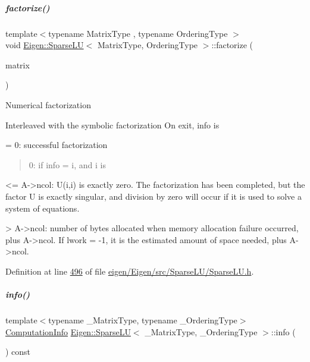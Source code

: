 \mbox{\label{group___sparse_l_u___module_a39858b0e72f2659d596364e252b34cbc}} 
\subparagraph{\texorpdfstring{factorize()}{factorize()}}
{\footnotesize\ttfamily template$<$typename Matrix\+Type , typename Ordering\+Type $>$ \\
void \hyperlink{group___sparse_l_u___module_class_eigen_1_1_sparse_l_u}{Eigen\+::\+Sparse\+LU}$<$ Matrix\+Type, Ordering\+Type $>$\+::factorize (\begin{DoxyParamCaption}\item[{const Matrix\+Type \&}]{matrix }\end{DoxyParamCaption})}


\begin{DoxyItemize}
\item Numerical factorization
\item Interleaved with the symbolic factorization On exit, info is

= 0\+: successful factorization
\end{DoxyItemize}

\begin{quote}
0\+: if info = i, and i is \end{quote}
\begin{DoxyVerb}  <= A->ncol: U(i,i) is exactly zero. The factorization has
     been completed, but the factor U is exactly singular,
     and division by zero will occur if it is used to solve a
     system of equations.

  > A->ncol: number of bytes allocated when memory allocation
    failure occurred, plus A->ncol. If lwork = -1, it is
    the estimated amount of space needed, plus A->ncol.  \end{DoxyVerb}
 

Definition at line \hyperlink{eigen_2_eigen_2src_2_sparse_l_u_2_sparse_l_u_8h_source_l00496}{496} of file \hyperlink{eigen_2_eigen_2src_2_sparse_l_u_2_sparse_l_u_8h_source}{eigen/\+Eigen/src/\+Sparse\+L\+U/\+Sparse\+L\+U.\+h}.

\mbox{\label{group___sparse_l_u___module_ab0d0c1744ffd5a1dff578a44bcef2a3d}} 
\subparagraph{\texorpdfstring{info()}{info()}\hspace{0.1cm}{\footnotesize\ttfamily [1/2]}}
{\footnotesize\ttfamily template$<$typename \+\_\+\+Matrix\+Type, typename \+\_\+\+Ordering\+Type$>$ \\
\hyperlink{group__enums_ga85fad7b87587764e5cf6b513a9e0ee5e}{Computation\+Info} \hyperlink{group___sparse_l_u___module_class_eigen_1_1_sparse_l_u}{Eigen\+::\+Sparse\+LU}$<$ \+\_\+\+Matrix\+Type, \+\_\+\+Ordering\+Type $>$\+::info (\begin{DoxyParamCaption}{ }\end{DoxyParamCaption}) const\hspace{0.3cm}{\ttfamily [inline]}}



